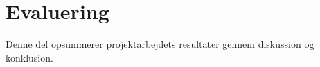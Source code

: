 \part{Evaluering}
Denne del opsummerer projektarbejdets resultater gennem diskussion og konklusion. 



